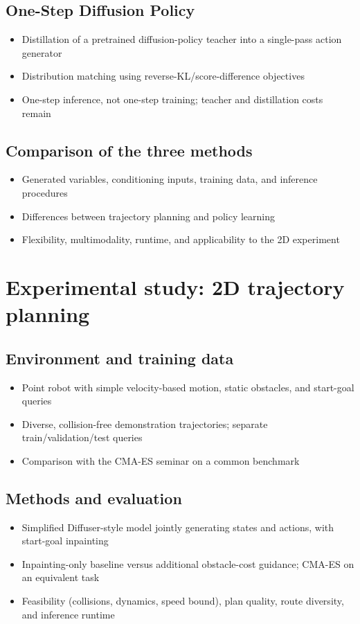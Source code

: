 \documentclass[a4paper]{IEEEtran}
\begin{document}
\subsection{One-Step Diffusion Policy}
\begin{itemize}
    \item Distillation of a pretrained diffusion-policy teacher into a single-pass action generator~\cite{wang2025onestep}
    \item Distribution matching using reverse-KL/score-difference objectives
    \item One-step inference, not one-step training; teacher and distillation costs remain
\end{itemize}
\subsection{Comparison of the three methods}
\begin{itemize}
    \item Generated variables, conditioning inputs, training data, and inference procedures
    \item Differences between trajectory planning and policy learning
    \item Flexibility, multimodality, runtime, and applicability to the 2D experiment
\end{itemize}

\section{Experimental study: 2D trajectory planning}
\subsection{Environment and training data}
\begin{itemize}
    \item Point robot with simple velocity-based motion, static obstacles, and start-goal queries
    \item Diverse, collision-free demonstration trajectories; separate train/validation/test queries
    \item Comparison with the CMA-ES seminar on a common benchmark
\end{itemize}
\subsection{Methods and evaluation}
\begin{itemize}
    \item Simplified Diffuser-style model jointly generating states and actions, with start-goal inpainting
    \item Inpainting-only baseline versus additional obstacle-cost guidance; CMA-ES on an equivalent task
    \item Feasibility (collisions, dynamics, speed bound), plan quality, route diversity, and inference runtime
\end{itemize}
\end{document}
